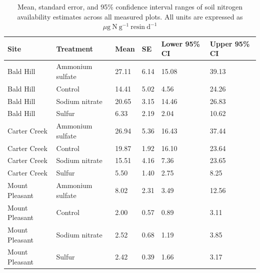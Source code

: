 \newpage
\begin{landscape}
\begin{table}[]
    \caption{Mean, standard error, and 95\% confidence interval ranges of soil nitrogen availability estimates across all measured plots. All units are expressed as $\mu \mathrm{g\ N\ g^{-1}\ resin\ d^{-1}}$}
    \centering
    \label{tab:table.b4}
    \begin{tabular}{p{3cm}p{3.5cm}p{1.5cm}p{1.5cm}p{2.75cm}p{2.75cm}}
        \hline
        Site           & Treatment        & Mean  & SE   & Lower 95\% CI & Upper 95\% CI \\
        \hline
        Bald Hill      & Ammonium sulfate & 27.11 & 6.14 & 15.08         & 39.13         \\
        Bald Hill      & Control          & 14.41 & 5.02 & 4.56          & 24.26         \\
        Bald Hill      & Sodium nitrate   & 20.65 & 3.15 & 14.46         & 26.83         \\
        Bald Hill      & Sulfur           & 6.33  & 2.19 & 2.04          & 10.62         \\
        Carter Creek   & Ammonium sulfate & 26.94 & 5.36 & 16.43         & 37.44         \\
        Carter Creek   & Control          & 19.87 & 1.92 & 16.10         & 23.64         \\
        Carter Creek   & Sodium nitrate   & 15.51 & 4.16 & 7.36          & 23.65         \\
        Carter Creek   & Sulfur           & 5.50  & 1.40 & 2.75          & 8.25          \\
        Mount Pleasant & Ammonium sulfate & 8.02  & 2.31 & 3.49          & 12.56         \\
        Mount Pleasant & Control          & 2.00  & 0.57 & 0.89          & 3.11          \\
        Mount Pleasant & Sodium nitrate   & 2.52  & 0.68 & 1.19          & 3.85          \\
        Mount Pleasant & Sulfur           & 2.42  & 0.39 & 1.66          & 3.17         
    \end{tabular}%
    \end{table}
\end{landscape}
\clearpage

